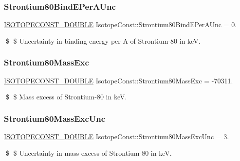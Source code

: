 \subsubsection{\texorpdfstring{Strontium80\+Bind\+E\+Per\+A\+Unc}{Strontium80BindEPerAUnc}}
{\footnotesize\ttfamily \mbox{\hyperlink{group___isotope_const-_macros_ga8f45a7272ce02c0b4c65c44636ed719a}{I\+S\+O\+T\+O\+P\+E\+C\+O\+N\+S\+T\+\_\+\+D\+O\+U\+B\+LE}} Isotope\+Const\+::\+Strontium80\+Bind\+E\+Per\+A\+Unc = 0.}

\$ \$ Uncertainty in binding energy per A of Strontium-\/80 in keV. \mbox{\label{group___isotope_const-_strontium-_sr80_gab85495c95eac79a28a50bebbb01932cc}} 
\subsubsection{\texorpdfstring{Strontium80\+Mass\+Exc}{Strontium80MassExc}}
{\footnotesize\ttfamily \mbox{\hyperlink{group___isotope_const-_macros_ga8f45a7272ce02c0b4c65c44636ed719a}{I\+S\+O\+T\+O\+P\+E\+C\+O\+N\+S\+T\+\_\+\+D\+O\+U\+B\+LE}} Isotope\+Const\+::\+Strontium80\+Mass\+Exc = -\/70311.}

\$ \$ Mass excess of Strontium-\/80 in keV. \mbox{\label{group___isotope_const-_strontium-_sr80_gae6a358eed5085cb11879a9157dbc51a0}} 
\subsubsection{\texorpdfstring{Strontium80\+Mass\+Exc\+Unc}{Strontium80MassExcUnc}}
{\footnotesize\ttfamily \mbox{\hyperlink{group___isotope_const-_macros_ga8f45a7272ce02c0b4c65c44636ed719a}{I\+S\+O\+T\+O\+P\+E\+C\+O\+N\+S\+T\+\_\+\+D\+O\+U\+B\+LE}} Isotope\+Const\+::\+Strontium80\+Mass\+Exc\+Unc = 3.}

\$ \$ Uncertainty in mass excess of Strontium-\/80 in keV. \mbox{\label{group___isotope_const-_strontium-_sr80_gafd4ee76666c61ec1f88913bdc197d055}} 

